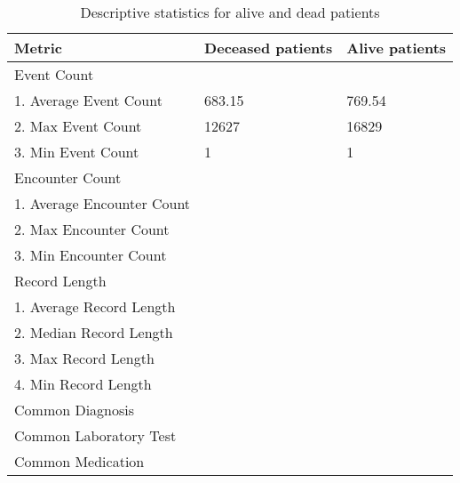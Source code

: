 \documentclass[12pt]{article}
\begin{document}
\begin{table}[th]
\centering
\begin{tabular}{@{}l|l|l}
\toprule
Metric & Deceased patients & Alive patients  \\ \hline
Event Count &  &  \\ 
1. Average Event Count & 683.15 & 769.54 \\
2. Max Event Count  & 12627 & 16829\\
3. Min Event Count  & 1 	& 1\\ \hline

Encounter Count & &  \\ 
1. Average Encounter Count  &&\\
2. Max Encounter Count  &&\\
3. Min Encounter Count  &&\\ \hline

Record Length & &  \\ 
1. Average Record Length &&\\
2. Median Record Length &&\\
3. Max Record Length&& \\
4. Min Record Length&& \\ \hline

Common Diagnosis & &  \\ \hline

Common Laboratory Test & &  \\ \hline

Common Medication & &  \\ 
\bottomrule
\end{tabular}
\caption{Descriptive statistics for alive and dead patients\label{tbl:stat}}
\end{table} 
\end{document}
